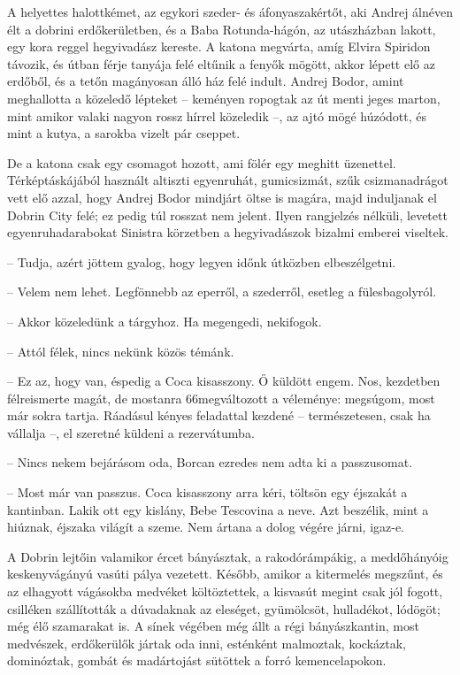 \documentclass{IEEEtran}
\begin{document}
A helyettes halottkémet, az egykori szeder- és áfonyaszakértőt, aki Andrej
álnéven élt a dobrini erdőkerületben, és a Baba Rotunda-hágón, az utászházban
lakott, egy kora reggel hegyivadász kereste. A katona megvárta, amíg Elvira
Spiridon távozik, és útban férje tanyája felé eltűnik a fenyők mögött, akkor
lépett elő az erdőből, és a tetőn magányosan álló ház felé indult. Andrej
Bodor, amint meghallotta a közeledő lépteket – keményen ropogtak az út menti
jeges marton, mint amikor valaki nagyon rossz hírrel közeledik –, az ajtó mögé
húzódott, és mint a kutya, a sarokba vizelt pár cseppet.

De a katona csak egy csomagot hozott, ami fölér egy meghitt üzenettel.
Térképtáskájából használt altiszti egyenruhát, gumicsizmát, szűk
csizmanadrágot vett elő azzal, hogy Andrej Bodor mindjárt öltse is magára,
majd induljanak el Dobrin City felé; ez pedig túl rosszat nem jelent. Ilyen
rangjelzés nélküli, levetett egyenruhadarabokat Sinistra körzetben a
hegyivadászok bizalmi emberei viseltek.

– Tudja, azért jöttem gyalog, hogy legyen időnk útközben elbeszélgetni.

– Velem nem lehet. Legfönnebb az eperről, a szederről, esetleg a
fülesbagolyról.

– Akkor közeledünk a tárgyhoz. Ha megengedi, nekifogok.

– Attól félek, nincs nekünk közös témánk.

– Ez az, hogy van, éspedig a Coca kisasszony. Ő küldött engem. Nos, kezdetben
félreismerte magát, de mostanra 66megváltozott a véleménye: megsúgom, most már
sokra tartja. Ráadásul kényes feladattal kezdené – természetesen, csak ha
vállalja –, el szeretné küldeni a rezervátumba.

– Nincs nekem bejárásom oda, Borcan ezredes nem adta ki a passzusomat.

– Most már van passzus. Coca kisasszony arra kéri, töltsön egy éjszakát a
kantinban. Lakik ott egy kislány, Bebe Tescovina a neve. Azt beszélik, mint a
hiúznak, éjszaka világít a szeme. Nem ártana a dolog végére járni, igaz-e.

A Dobrin lejtőin valamikor ércet bányásztak, a rakodórámpákig, a meddőhányóig
keskenyvágányú vasúti pálya vezetett. Később, amikor a kitermelés megszűnt, és
az elhagyott vágásokba medvéket költöztettek, a kisvasút megint csak jól
fogott, csilléken szállították a dúvadaknak az eleséget, gyümölcsöt,
hulladékot, lódögöt; még élő szamarakat is. A sínek végében még állt a régi
bányászkantin, most medvészek, erdőkerülők jártak oda inni, esténként
malmoztak, kockáztak, dominóztak, gombát és madártojást sütöttek a forró
kemencelapokon.
\end{document}
